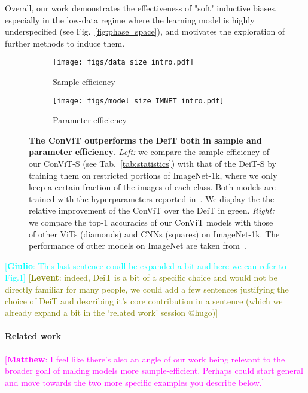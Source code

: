 \documentclass[a4paper,11pt,twocolumn]{article}
\newcommand{\levent}[1]{\textcolor{olive}{[\textbf{Levent}: #1]}}
\newcommand{\matthew}[1]{\textcolor{magenta}{[\textbf{Matthew}: #1]}}
\newcommand{\giulio}[1]{\textcolor{cyan}{[\textbf{Giulio}: #1]}}
\newcommand{\levent}[1]{}
\newcommand{\matthew}[1]{}
\newcommand{\giulio}[1]{}
\begin{document}
Overall, our work demonstrates the effectiveness of "soft" inductive biases, especially in the low-data regime where the learning model is highly underspecified (see Fig.~\ref{fig:phase_space}), and motivates the exploration of further methods to induce them. 

\begin{figure}[t]
    \centering
    \begin{subfigure}[b]{.49\columnwidth}
    \texttt{[image: figs/data\_size\_intro.pdf]}    
    \caption{Sample efficiency}
    \end{subfigure}
    \begin{subfigure}[b]{.49\columnwidth}
    \texttt{[image: figs/model\_size\_IMNET\_intro.pdf]}    
    \caption{Parameter efficiency}
    \end{subfigure}
\caption{\textbf{The ConViT outperforms the DeiT both in sample and parameter efficiency}. \textit{Left:} we compare the sample efficiency of our ConViT-S (see Tab.~\ref{tab:statistics}) with that of the DeiT-S by training them on restricted portions of ImageNet-1k, where we only keep a certain fraction of the images of each class. Both models are trained with the hyperparameters reported in~\cite{touvron2020training}. We display the the relative improvement of the ConViT over the DeiT in green. \textit{Right:} we compare the top-1 accuracies of our ConViT models with those of other ViTs (diamonds) and CNNs (squares) on ImageNet-1k. The performance of other models on ImageNet are taken from~\cite{touvron2020training,he2016deep,tan2019efficientnet,wu_visual_2020,yuan2021tokens}.}
    \label{fig:sota}
\end{figure}

\giulio{This last sentence coudl be expanded a bit and here we can refer to Fig.1} \levent{indeed, DeiT is a bit of a specific choice and would not be directly familiar for many people, we could add a few sentences justifying the choice of DeiT and describing it's core contribution in a sentence (which we already expand a bit in the `related work' session @hugo)}

\paragraph{Related work}
\matthew{I feel like there's also an angle of our work being relevant to the broader goal of making models more sample-efficient. Perhaps could start general and move towards the two more specific examples you describe below.}
\end{document}

